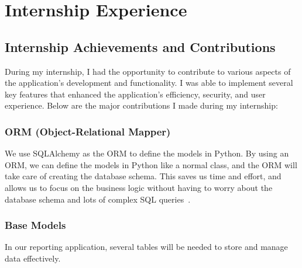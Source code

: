 \chapter{Internship Experience}
\label{ch:internship_experience}

\section{Internship Achievements and Contributions}
\label{sec:internship_experience:achievements_contributions}

During my internship, I had the opportunity to contribute to various aspects of the application's development and functionality. I was able to implement several key features that enhanced the application's efficiency, security, and user experience. Below are the major contributions I made during my internship:

\subsection{ORM (Object-Relational Mapper)}
\label{subsec:internship_experience:orm}

We use SQLAlchemy as the ORM to define the models in Python. By using an ORM, we can define the models in Python like a normal class, and the ORM will take care of creating the database schema. This saves us time and effort, and allows us to focus on the business logic without having to worry about the database schema and lots of complex SQL queries~\cite{noauthor_sqlalchemy_nodate}.

\subsection{Base Models}
\label{subsec:internship_experience:base_models}

In our reporting application, several tables will be needed to store and manage data effectively.

